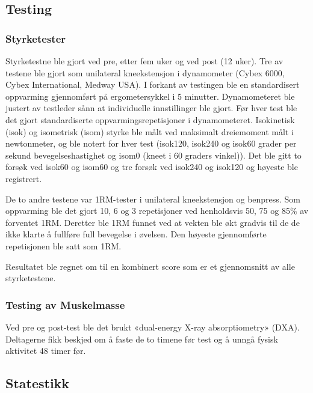 \documentclass[
]{book}
\begin{document}
\hypertarget{testing}{%
\subsection{Testing}\label{testing}}

\hypertarget{styrketester}{%
\subsubsection{Styrketester}\label{styrketester}}

Styrketestne ble gjort ved pre, etter fem uker og ved post (12 uker). Tre av testene ble gjort som unilateral kneekstensjon i dynamometer (Cybex 6000, Cybex International, Medway USA). I forkant av testingen ble en standardisert oppvarming gjennomført på ergometersykkel i 5 minutter. Dynamometeret ble justert av testleder sånn at individuelle innstillinger ble gjort. Før hver test ble det gjort standardiserte oppvarmingsrepetisjoner i dynamometeret. Isokinetisk (isok) og isometrisk (isom) styrke ble målt ved maksimalt dreiemoment målt i newtonmeter, og ble notert for hver test (isok120, isok240 og isok60 grader per sekund bevegelseshastighet og isom0 (kneet i 60 graders vinkel)). Det ble gitt to forsøk ved isok60 og isom60 og tre forsøk ved isok240 og isok120 og høyeste ble registrert.

De to andre testene var 1RM-tester i unilateral kneekstensjon og benpress. Som oppvarming ble det gjort 10, 6 og 3 repetisjoner ved henholdsvis 50, 75 og 85\% av forventet 1RM. Deretter ble 1RM funnet ved at vekten ble økt gradvis til de de ikke klarte å fullføre full bevegelse i øvelsen. Den høyeste gjennomførte repetisjonen ble satt som 1RM.

Resultatet ble regnet om til en kombinert score som er et gjennomsnitt av alle styrketestene.

\hypertarget{testing-av-muskelmasse}{%
\subsubsection{Testing av Muskelmasse}\label{testing-av-muskelmasse}}

Ved pre og post-test ble det brukt «dual-energy X-ray absorptiometry» (DXA). Deltagerne fikk beskjed om å faste de to timene før test og å unngå fysisk aktivitet 48 timer før. ~

\hypertarget{statestikk}{%
\subsection{Statestikk}\label{statestikk}}
\end{document}
